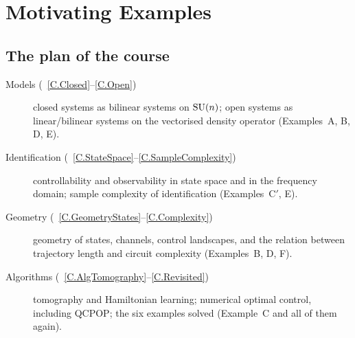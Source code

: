 \documentclass[handoutsbeamer.tex]{subfiles}
\begin{document}
\ona{ \setcounter{chapter}{0} } %
\chapter{Motivating Examples}\label{C.Motivation}

\section{The plan of the course}

\begin{frame}
\begin{description}
    \item[Models (\Chaps~\ref{C.Closed}--\ref{C.Open})] closed systems as bilinear systems on $\SU[n]$; open systems as linear/bilinear systems on the vectorised density operator (Examples~A, B, D, E).
    \item[Identification (\Chaps~\ref{C.StateSpace}--\ref{C.SampleComplexity})] controllability and observability in state space and in the frequency domain; sample complexity of identification (Examples~C$'$, E).
    \item[Geometry (\Chaps~\ref{C.GeometryStates}--\ref{C.Complexity})] geometry of states, channels, control landscapes, and the relation between trajectory length and circuit complexity (Examples~B, D, F).
    \item[Algorithms (\Chaps~\ref{C.AlgTomography}--\ref{C.Revisited})] tomography and Hamiltonian learning; numerical optimal control, including QCPOP; the six examples solved (Example~C and all of them again).
\end{description}
\end{frame}

\begin{frame}
\onp{\begin{center}\resizebox{\linewidth}{!}{}\end{center}}
\end{frame}
\end{document}
